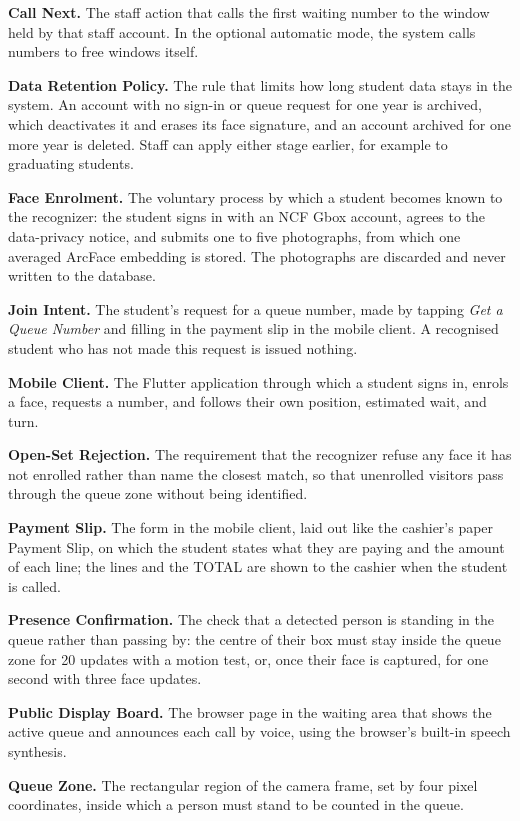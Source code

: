 \documentclass{research}
\begin{document}
\textbf{Call Next.} The staff action that calls the first waiting
number to the window held by that staff account. In the optional
automatic mode, the system calls numbers to free windows itself.

\textbf{Data Retention Policy.} The rule that limits how long student
data stays in the system. An account with no sign-in or queue request for
one year is archived, which deactivates it and erases its face
signature, and an account archived for one more year is deleted. Staff
can apply either stage earlier, for example to graduating students.

\textbf{Face Enrolment.} The voluntary process by which a student
becomes known to the recognizer: the student signs in with an NCF Gbox
account, agrees to the data-privacy notice, and submits one to five
photographs, from which one averaged ArcFace embedding is stored. The
photographs are discarded and never written to the database.

\textbf{Join Intent.} The student's request for a queue number, made by
tapping \emph{Get a Queue Number} and filling in the payment slip in the
mobile client. A recognised student who has not made this request is
issued nothing.

\textbf{Mobile Client.} The Flutter application through which a student
signs in, enrols a face, requests a number, and follows their own
position, estimated wait, and turn.

\textbf{Open-Set Rejection.} The requirement that the recognizer refuse
any face it has not enrolled rather than name the closest match, so that
unenrolled visitors pass through the queue zone without being
identified.

\textbf{Payment Slip.} The form in the mobile client, laid out like the
cashier's paper Payment Slip, on which the student states what they are
paying and the amount of each line; the lines and the TOTAL are shown to
the cashier when the student is called.

\textbf{Presence Confirmation.} The check that a detected person is
standing in the queue rather than passing by: the centre of their box
must stay inside the queue zone for 20 updates with a motion test, or,
once their face is captured, for one second with three face updates.

\textbf{Public Display Board.} The browser page in the waiting area that
shows the active queue and announces each call by voice, using the
browser's built-in speech synthesis.

\textbf{Queue Zone.} The rectangular region of the camera frame, set by
four pixel coordinates, inside which a person must stand to be counted
in the queue.
\end{document}
